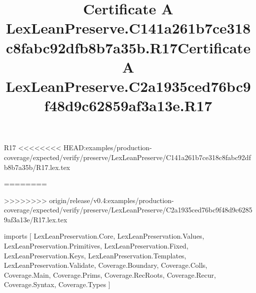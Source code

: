 \begin{lexlean}{R17}
<<<<<<<< HEAD:examples/production-coverage/expected/verify/preserve/LexLeanPreserve/C141a261b7ce318c8fabc92dfb8b7a35b/R17.lex.tex
\title{Certificate A LexLeanPreserve.C141a261b7ce318c8fabc92dfb8b7a35b.R17}
========
\title{Certificate A LexLeanPreserve.C2a1935ced76bc9f48d9c62859af3a13e.R17}
>>>>>>>> origin/release/v0.4:examples/production-coverage/expected/verify/preserve/LexLeanPreserve/C2a1935ced76bc9f48d9c62859af3a13e/R17.lex.tex
\begin{coremodule}
imports [
  LexLeanPreservation.Core,
  LexLeanPreservation.Values,
  LexLeanPreservation.Primitives,
  LexLeanPreservation.Fixed,
  LexLeanPreservation.Keys,
  LexLeanPreservation.Templates,
  LexLeanPreservation.Validate,
  Coverage.Boundary,
  Coverage.Colls,
  Coverage.Main,
  Coverage.Prims,
  Coverage.RecRoots,
  Coverage.Recur,
  Coverage.Syntax,
  Coverage.Types
]


\end{coremodule}
\end{lexlean}
